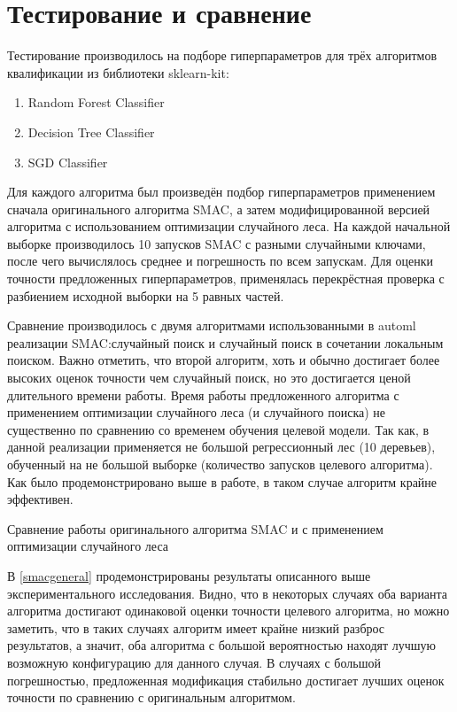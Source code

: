 \section{Тестирование и сравнение}

Тестирование производилось на подборе гиперпараметров для трёх алгоритмов
квалификации из библиотеки sklearn-kit:

\begin{enumerate}
    \item Random Forest Classifier
    \item Decision Tree Classifier
    \item SGD Classifier
\end{enumerate}

Для каждого алгоритма был произведён подбор гиперпараметров применением сначала
оригинального алгоритма SMAC, а затем модифицированной версией алгоритма
с использованием оптимизации случайного леса. На каждой начальной выборке
производилось 10 запусков SMAC с разными случайными ключами, после чего
вычислялось среднее и погрешность по всем запускам. Для оценки точности
предложенных гиперпараметров, применялась перекрёстная проверка с разбиением
исходной выборки на 5 равных частей.

Сравнение производилось с двумя алгоритмами использованными в automl реализации
SMAC:\@ случайный поиск и случайный поиск в сочетании локальным поиском. Важно
отметить, что второй алгоритм, хоть и обычно достигает более высоких оценок
точности чем случайный поиск, но это достигается ценой длительного времени
работы. Время работы предложенного алгоритма с применением оптимизации
случайного леса (и случайного поиска) не существенно по сравнению со временем
обучения целевой модели. Так как, в данной реализации применяется не большой
регрессионный лес (10 деревьев), обученный на не большой выборке (количество
запусков целевого алгоритма). Как было продемонстрировано выше в работе, в таком
случае алгоритм крайне эффективен.

\begin{table}[!ht]
\centering
\caption{Сравнение работы оригинального алгоритма SMAC и с применением оптимизации
случайного леса}\label{smacgeneral}
\smacgeneral
\end{table}

В \cref{smacgeneral} продемонстрированы результаты описанного выше
экспериментального исследования. Видно, что в некоторых случаях оба варианта
алгоритма достигают одинаковой оценки точности целевого алгоритма, но можно
заметить, что в таких случаях алгоритм имеет крайне низкий разброс результатов,
а значит, оба алгоритма с большой вероятностью находят лучшую возможную
конфигурацию для данного случая. В случаях с большой погрешностью, предложенная
модификация стабильно достигает лучших оценок точности по сравнению
с оригинальным алгоритмом.

